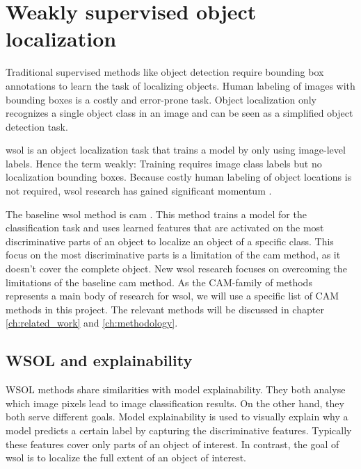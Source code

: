 \section{Weakly supervised object localization}
Traditional supervised methods like object detection require bounding box annotations to learn the task of localizing objects. Human labeling of images with bounding boxes is a costly and error-prone task. Object localization only recognizes a single object class in an image and can be seen as a simplified object detection task. 

\acrshort{wsol} is an object localization task that trains a model by only using image-level labels. Hence the term weakly: Training requires image class labels but no localization bounding boxes. Because costly human labeling of object locations is not required, \acrshort{wsol} research has gained significant momentum \cite{zhou2016cvpr, selvaraju2017grad, chattopadhay2018grad, wang2021minmaxcam, wang2020score, choe2020evaluating}.

The baseline \acrshort{wsol} method is \acrfull{cam} \cite{zhou2016cvpr}. This method trains a model for the classification task and uses learned features that are activated on the most discriminative parts of an object to localize an object of a specific class. This focus on the most discriminative parts is a limitation of the \acrshort{cam} method, as it doesn't cover the complete object. New \acrshort{wsol} research \cite{selvaraju2017grad, chattopadhay2018grad, wang2021minmaxcam, wang2020score, choe2020evaluating} focuses on overcoming the limitations of the baseline \acrshort{cam} method. As the CAM-family of methods represents a main body of research for \acrlong{wsol}, we will use a specific list of CAM methods in this project. The relevant methods will be discussed in chapter \ref{ch:related_work} and \ref{ch:methodology}. 

\subsection{WSOL and explainability}
WSOL methods share similarities with model explainability. They both analyse which image pixels lead to image classification results. On the other hand, they both serve different goals.
Model explainability is used to visually explain why a model predicts a certain label by capturing the discriminative features. Typically these features cover only parts of an object of interest. In contrast, the goal of \acrshort{wsol} is to localize the full extent of an object of interest.

